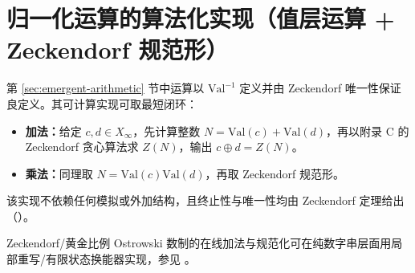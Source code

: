 \section{归一化运算的算法化实现（值层运算 + Zeckendorf 规范形）}
\label{app:normalization}

第 \ref{sec:emergent-arithmetic} 节中运算以 $\mathrm{Val}^{-1}$ 定义并由 Zeckendorf 唯一性保证良定义。其可计算实现可取最短闭环：
\begin{itemize}
  \item \textbf{加法：}给定 $c,d\in X_\infty$，先计算整数 $N=\mathrm{Val}(c)+\mathrm{Val}(d)$，再以附录 C 的 Zeckendorf 贪心算法求 $Z(N)$，输出 $c\oplus d=Z(N)$。
  \item \textbf{乘法：}同理取 $N=\mathrm{Val}(c)\mathrm{Val}(d)$，再取 Zeckendorf 规范形。
\end{itemize}
该实现不依赖任何模拟或外加结构，且终止性与唯一性均由 Zeckendorf 定理给出（\cite{Zeckendorf1972}）。

\begin{remark}\label{rem:zeckendorf-normalize-fst}
Zeckendorf/黄金比例 Ostrowski 数制的在线加法与规范化可在纯数字串层面用局部重写/有限状态换能器实现，参见 \cite{Frougny1992NumbersAutomata,Frougny1999OnlineAddition,AhlbachUsatineFrougnyPippenger2013,HieronymiTerry2018OstrowskiAddition}。
\end{remark}
